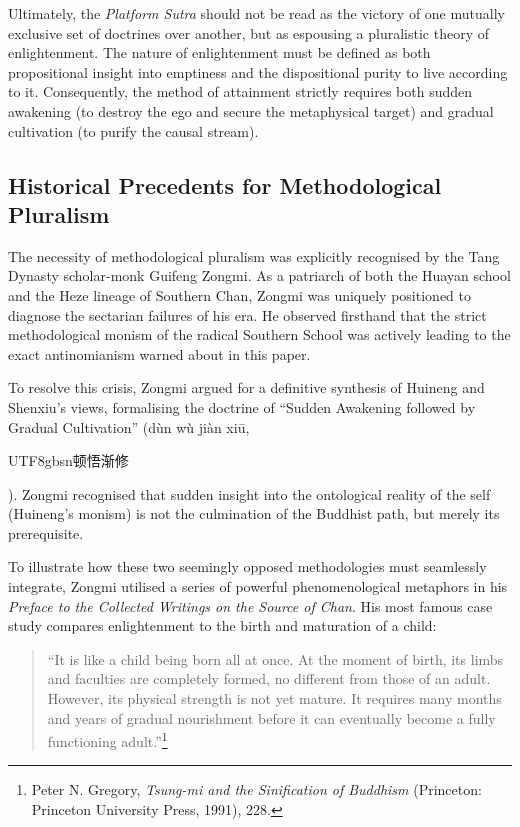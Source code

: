 Ultimately, the \emph{Platform Sutra} should not be read as the victory
of one mutually exclusive set of doctrines over another, but as
espousing a pluralistic theory of enlightenment. The nature of
enlightenment must be defined as both propositional insight into
emptiness and the dispositional purity to live according to it.
Consequently, the method of attainment strictly requires both sudden
awakening (to destroy the ego and secure the metaphysical target) and
gradual cultivation (to purify the causal stream).

\subsection{Historical Precedents for Methodological Pluralism}

The necessity of methodological pluralism was explicitly recognised by
the Tang Dynasty scholar-monk Guifeng Zongmi. As a patriarch of both the
Huayan school and the Heze lineage of Southern Chan, Zongmi was uniquely
positioned to diagnose the sectarian failures of his era. He observed
firsthand that the strict methodological monism of the radical Southern
School was actively leading to the exact antinomianism warned about in
this paper.

To resolve this crisis, Zongmi argued for a definitive synthesis of
Huineng and Shenxiu's views, formalising the doctrine of ``Sudden
Awakening followed by Gradual Cultivation'' (dùn wù jiàn xiū, \begin{CJK*}{UTF8}{gbsn}顿悟渐修\end{CJK*}).
Zongmi recognised that sudden insight into the ontological reality of
the self (Huineng's monism) is not the culmination of the Buddhist path,
but merely its prerequisite.

To illustrate how these two seemingly opposed methodologies must
seamlessly integrate, Zongmi utilised a series of powerful
phenomenological metaphors in his \emph{Preface to the Collected
Writings on the Source of Chan}. His most famous case study compares
enlightenment to the birth and maturation of a child:

\begin{quote}
    ``It is like a child being born all at once. At the moment of birth, its
limbs and faculties are completely formed, no different from those of an
adult. However, its physical strength is not yet mature. It requires
many months and years of gradual nourishment before it can eventually
become a fully functioning adult.''\footnote{Peter N. Gregory,
  \emph{Tsung-mi and the Sinification of Buddhism} (Princeton: Princeton
  University Press, 1991), 228.}
\end{quote}

